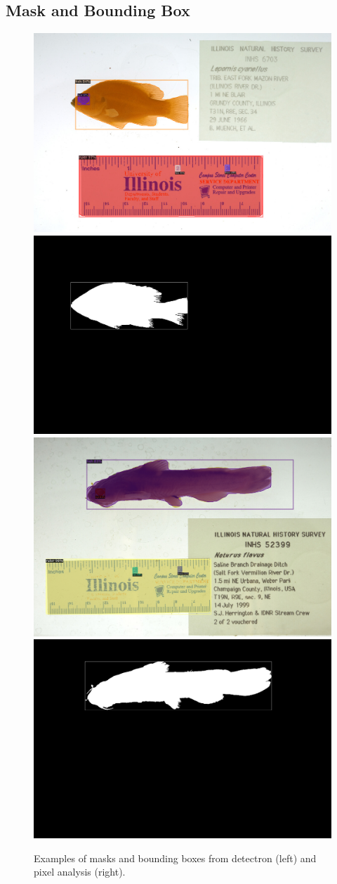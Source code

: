 \documentclass[conference]{IEEEtran}
\begin{document}

\subsection{Mask and Bounding Box}

\begin{figure}[t]
  \centering
  \includegraphics[width=0.49\linewidth]{images/6703_pred}
  \includegraphics[width=0.49\linewidth]{images/6703_mask}
  \includegraphics[width=0.49\linewidth]{images/52399_pred}
  \includegraphics[width=0.49\linewidth]{images/52399_mask}
  \caption{Examples of masks and bounding boxes from detectron (left) and pixel analysis (right).}
  \label{fig:bbox_mask}
\end{figure}
\end{document}
